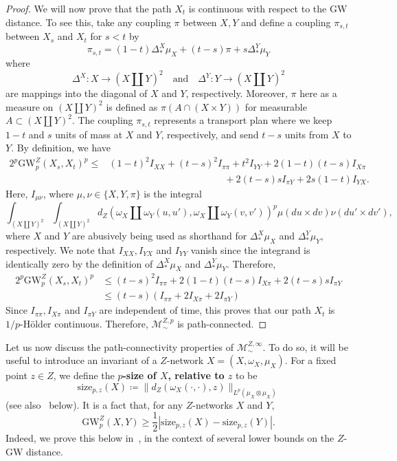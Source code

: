 \documentclass[twoside,11pt]{article}
\theoremstyle{definition}
\newcommand{\M}{\mathcal{M}}
\newcommand{\MZp}{\M_{\sim}^{Z,p}}
\newcommand{\dgwz}{\mathrm{GW}_p^Z}
\newcommand{\define}[1]{\textbf{#1}}
\begin{document}
\begin{proof}
 We will now prove that the path $X_t$ is continuous with respect to the GW distance. To see this, take any coupling $\pi$ between $X,Y$ and define a coupling $\pi_{s,t}$ between $X_s$ and $X_t$ for $s<t$ by 
 \[
 \pi_{s,t}=(1-t)\Delta^X_*\mu_X+(t-s)\pi+s\Delta^Y_*\mu_Y
 \]
 where 
 \[
 \Delta^X:X\to (X\amalg Y)^2 \quad \mbox{and} \quad \Delta^Y: Y\to (X\amalg Y)^2
 \]
 are mappings into the diagonal of $X$ and $Y$, respectively. Moreover, $\pi$ here as a measure on $(X\amalg Y)^2$ is defined as $\pi(A\cap (X\times Y))$ for measurable $A\subset (X\amalg Y)^2$. The coupling $\pi_{s,t}$ represents a transport plan where we keep $1-t$ and $s$ units of mass at $X$ and $Y$, respectively, and send $t-s$ units from $X$ to $Y$. By definition, we have
    \begin{align}
        2^p\dgwz(X_s, X_t)^p \leq & (1-t)^2 I_{X X} + (t-s)^2I_{\pi\pi} + t^2I_{YY}+2(1-t)(t-s)I_{X \pi} \\ 
        & \hspace{2in} +2(t-s)sI_{\pi Y}+ 2s(1-t)I_{Y X}.
    \end{align}
    Here, $I_{\mu\nu}$, where $\mu,\nu \in \{X,Y,\pi\}$ is the integral
    \begin{equation}
        \int_{(X\amalg Y)^2}\int_{(X\amalg Y)^2}d_Z(\omega_X\amalg \omega_Y(u,u'), \omega_X \amalg \omega_Y(v,v'))^p\mu(du\times dv)\nu(du'\times dv'),
    \end{equation}
    where $X$ and $Y$ are abusively being used as shorthand for $\Delta^X_*\mu_X$ and $\Delta^Y_*\mu_Y$, respectively. We note that $I_{XX}, I_{YX}$ and $I_{YY}$ vanish since the integrand is identically zero by the definition of $\Delta_*^X\mu_X$ and $\Delta_*^Y\mu_Y$. Therefore,
    \begin{align}
        2^p\dgwz(X_s, X_t)^p & \leq (t-s)^2I_{\pi\pi} +2(1-t)(t-s)I_{X \pi} +2(t-s)sI_{\pi Y} \\ &\leq (t-s)(I_{\pi\pi} +2I_{X\pi} + 2 I_{\pi Y}) \label{eqn:proof_of_continuity_paths}
    \end{align}
    Since $I_{\pi\pi}, I_{X\pi}$ and $I_{\pi Y}$ are independent of time, this proves that our path $X_t$ is $1/p$-Hölder continuous. Therefore, $\MZp$ is path-connected.
\end{proof}

Let us now discuss the path-connectivity properties of $\mathcal{M}^{Z,\infty}_\sim$. 
To do so, it will be useful to introduce an invariant of a $Z$-network $X = (X,\omega_X,\mu_X)$. For a fixed point $z \in Z$, we define the \define{$p$-size of $X$, relative to $z$} to be 
\begin{equation}\label{eqn:size_function}
\mathrm{size}_{p,z}(X) \coloneqq \|d_Z(\omega_X(\cdot,\cdot),z)\|_{L^p(\mu_X \otimes \mu_X)}
\end{equation}
(see also~ below). It is a fact that, for any $Z$-networks $X$ and $Y$,
\begin{equation}\label{eqn:size_bound}
\dgwz(X,Y) \geq \frac{1}{2}|\mathrm{size}_{p,z}(X) - \mathrm{size}_{p,z}(Y)|.
\end{equation}
Indeed, we prove this below in~, in the context of several lower bounds on the $Z$-GW distance.
\end{document}
